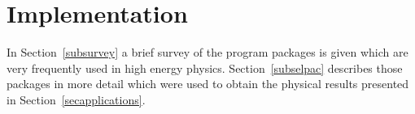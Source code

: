 %
\section{\label{secimpl}Implementation}
%
In Section~\ref{subsurvey} a brief survey of the program packages is
given which are very frequently used in high energy physics.
Section~\ref{subselpac} describes those packages in more detail which
were used to obtain the physical results presented in
Section~\ref{secapplications}.


